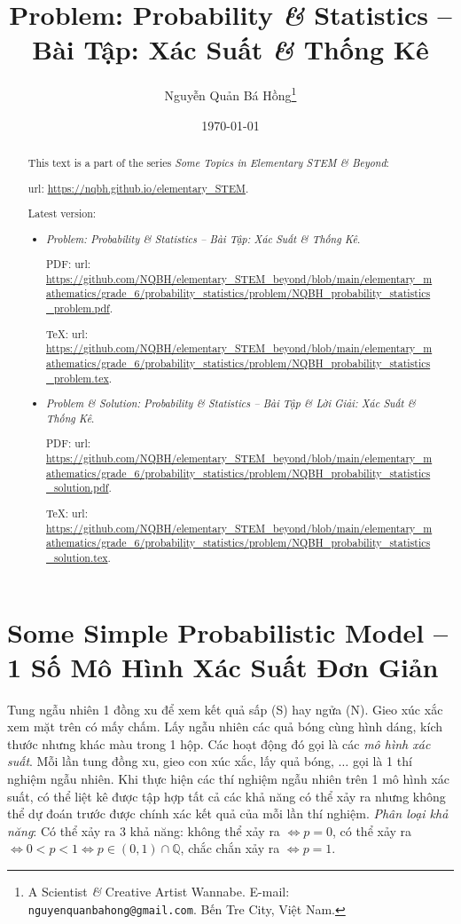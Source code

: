 \documentclass{article}
\title{Problem: Probability {\it\&} Statistics -- Bài Tập: Xác Suất {\it\&} Thống Kê}
\author{Nguyễn Quản Bá Hồng\footnote{A Scientist {\it\&} Creative Artist Wannabe. E-mail: {\tt nguyenquanbahong@gmail.com}. Bến Tre City, Việt Nam.}}
\date{\today}
\begin{document}
\maketitle
\begin{abstract}
	This text is a part of the series {\it Some Topics in Elementary STEM \& Beyond}:
	
	{\sc url}: \url{https://nqbh.github.io/elementary_STEM}.
	
	Latest version:
	\begin{itemize}
		\item {\it Problem: Probability {\it\&} Statistics -- Bài Tập: Xác Suất {\it\&} Thống Kê}.
		
		PDF: {\sc url}: \url{https://github.com/NQBH/elementary_STEM_beyond/blob/main/elementary_mathematics/grade_6/probability_statistics/problem/NQBH_probability_statistics_problem.pdf}.
		
		\TeX: {\sc url}: \url{https://github.com/NQBH/elementary_STEM_beyond/blob/main/elementary_mathematics/grade_6/probability_statistics/problem/NQBH_probability_statistics_problem.tex}.
		\item {\it Problem \& Solution: Probability {\it\&} Statistics -- Bài Tập \& Lời Giải: Xác Suất {\it\&} Thống Kê}.
		
		PDF: {\sc url}: \url{https://github.com/NQBH/elementary_STEM_beyond/blob/main/elementary_mathematics/grade_6/probability_statistics/problem/NQBH_probability_statistics_solution.pdf}.
		
		\TeX: {\sc url}: \url{https://github.com/NQBH/elementary_STEM_beyond/blob/main/elementary_mathematics/grade_6/probability_statistics/problem/NQBH_probability_statistics_solution.tex}.
	\end{itemize}
\end{abstract}
\tableofcontents


\section{Some Simple Probabilistic Model -- 1 Số Mô Hình Xác Suất Đơn Giản}
 Tung ngẫu nhiên 1 đồng xu để xem kết quả sấp (S) hay ngửa (N). Gieo xúc xắc xem mặt trên có mấy chấm. Lấy ngẫu nhiên các quả bóng cùng hình dáng, kích thước nhưng khác màu trong 1 hộp. Các hoạt động đó gọi là các \textit{mô hình xác suất}. Mỗi lần tung đồng xu, gieo con xúc xắc, lấy quả bóng, $\ldots$ gọi là 1 thí nghiệm ngẫu nhiên.  Khi thực hiện các thí nghiệm ngẫu nhiên trên 1 mô hình xác suất, có thể liệt kê được tập hợp tất cả các khả năng có thể xảy ra nhưng không thể dự đoán trước được chính xác kết quả của mỗi lần thí nghiệm. \textit{Phân loại khả năng}: Có thể xảy ra 3 khả năng: không thể xảy ra $\Leftrightarrow p = 0$, có thể xảy ra $\Leftrightarrow0 < p < 1\Leftrightarrow p\in(0,1)\cap\mathbb{Q}$, chắc chắn xảy ra $\Leftrightarrow p = 1$.
\end{document}
